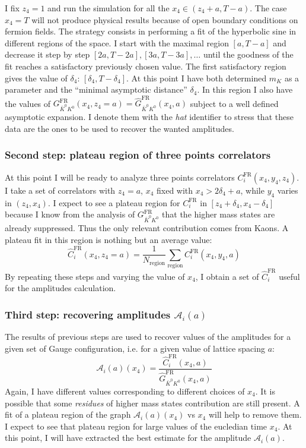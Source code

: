\documentclass[english, LaM, oneside, noexaminfo]{sapthesis}
\begin{document}
I fix $z_4 = 1$ and run the simulation for all the $x_4 \in (z_4+a,T-a)$.
The case $x_4 = T$ will not produce physical results because of open boundary conditions on fermion fields.
The strategy consists in performing a fit of the hyperbolic sine in different regions of the space.
I start with the maximal region $[a, T-a]$ and decrease it step by step $[2a,T-2a], [3a,T-3a], \dots $ until the goodness of the fit reaches a satisfactory previously chosen value.
The first satisfactory region gives the value of $\delta_4$: $[\delta_4, T-\delta_4]$.
At this point I have both determined $m_K$ as a parameter and the ``minimal asymptotic distance'' $\delta_4$.
In this region I also have the values of $G_{\bar K^0 K^0}^\text{FR}(x_4,z_4=a) = \hat G_{\bar K^0 K^0}^\text{FR}(x_4,a)$ subject to a well defined asymptotic expansion.
I denote them with the {\it hat} identifier to stress that these data are the ones to be used to recover the wanted amplitudes.

\subsubsection*{Second step: plateau region of three points correlators}
\noindent
At this point I will be ready to analyze three points correlators $C_i^\text{FR}(x_4,y_4,z_4)$.
I take a set of correlators with $z_4 = a$, $x_4$ fixed with $x_4 > 2\delta_4 + a$, while $y_4$ varies in $(z_4,x_4)$.
I expect to see a plateau region for $C_i^\text{FR}$ in $[z_4 + \delta_4 , x_4 - \delta_4]$ because I know from the analysis of $G^\text{FR}_{\bar K^0 K^0}$ that the higher mass states are already suppressed.
Thus the only relevant contribution comes from Kaons.
A plateau fit in this region is nothing but an average value:
\begin{equation*}
    \hat C_i^\text{FR}(x_4,z_4=a) = \frac{1}{N_\text{region}} \sum_\text{region} C_i^\text{FR}(x_4,y_4,a)
\end{equation*}
By repeating these steps and varying the value of $x_4$, I obtain a set of $\hat C_i^\text{FR}$ useful for the amplitudes calculation.

\subsubsection*{Third step: recovering amplitudes $\mathcal{A}_i(a)$}
\noindent
The results of previous steps are used to recover values of the amplitudes for a given set of Gauge configuration, i.e. for a given value of lattice spacing $a$:
\begin{equation*}
    \mathcal{A}_i (a) (x_4) = \frac{\hat C_i^\text{FR}(x_4,a)}{\hat G_{\bar K^0 K^0}^\text{FR}(x_4,a)}
\end{equation*}
Again, I have different values corresponding to different choices of $x_4$.
It is possible that some {\it residues} of higher mass states contribution are still present.
A fit of a plateau region of the graph $\mathcal{A}_i (a) (x_4)$ vs $x_4$ will help to remove them.
I expect to see that plateau region for large values of the eucledian time $x_4$.
At this point, I will have extracted the best estimate for the amplitude $\mathcal{A}_i (a)$.
\end{document}
